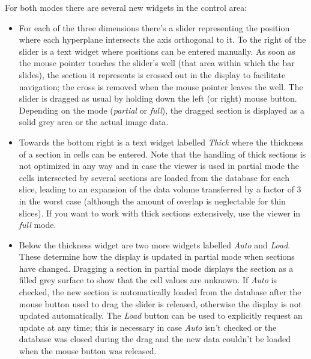 \documentclass[11pt]{article}
\begin{document}
For both modes there are several new widgets in the control area:

\begin{itemize}
\item
For each of the three dimensions there's a slider representing the position where each
hyperplane intersects the axis orthogonal to it. To the right of the slider is a
text widget where positions can be entered manually. As soon as the mouse pointer
touches the slider's well (that area within which the bar slides), the section it
represents is crossed out in the display to facilitate navigation; the cross is
removed when the mouse pointer leaves the well. The slider is dragged as usual
by holding down the left (or right) mouse button. Depending on the mode (\emph{partial}
or \emph{full}), the dragged section is displayed as a solid grey area or the actual
image data.
\item
Towards the bottom right is a text widget labelled \emph{Thick} where the thickness
of a section in cells can be entered. Note that the handling of thick sections is
not optimized in any way and in case the viewer is used in partial mode the cells
intersected by several sections are loaded from the database for each slice, leading
to an expansion of the data volume transferred by a factor of 3 in the worst case
(although the amount of overlap is neglectable for thin slices). If you want to
work with thick sections extensively, use the viewer in \emph{full} mode.
\item
Below the thickness widget are two more widgets labelled \emph{Auto} and
\emph{Load}. These determine how the display is updated in partial mode
when sections have changed. Dragging a section in partial mode displays
the section as a filled grey surface to show that the cell values are
unknown. If \emph{Auto} is checked, the new section is automatically loaded
from the database after the mouse button used to drag the slider is released,
otherwise the display is not updated automatically. The \emph{Load} button can
be used to explicitly request an update at any time; this is necessary in case
\emph{Auto} isn't checked or the database was closed during the drag and the
new data couldn't be loaded when the mouse button was released.
\end{itemize}
\end{document}
